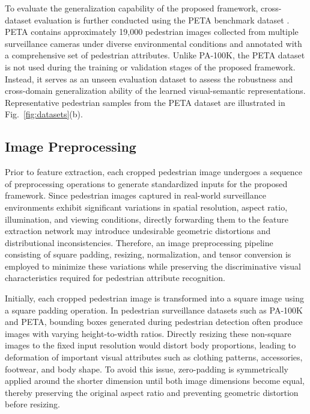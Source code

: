 \documentclass{ieeeaccess}
\begin{document}
To evaluate the generalization capability of the proposed framework, cross-dataset evaluation is further conducted using the PETA benchmark dataset \cite{PETA}. PETA contains approximately 19,000 pedestrian images collected from multiple surveillance cameras under diverse environmental conditions and annotated with a comprehensive set of pedestrian attributes. Unlike PA-100K, the PETA dataset is not used during the training or validation stages of the proposed framework. Instead, it serves as an unseen evaluation dataset to assess the robustness and cross-domain generalization ability of the learned visual-semantic representations. Representative pedestrian samples from the PETA dataset are illustrated in Fig.~\ref{fig:datasets}(b).

\subsection{Image Preprocessing}

Prior to feature extraction, each cropped pedestrian image undergoes a sequence of preprocessing operations to generate standardized inputs for the proposed framework. Since pedestrian images captured in real-world surveillance environments exhibit significant variations in spatial resolution, aspect ratio, illumination, and viewing conditions, directly forwarding them to the feature extraction network may introduce undesirable geometric distortions and distributional inconsistencies. Therefore, an image preprocessing pipeline consisting of square padding, resizing, normalization, and tensor conversion is employed to minimize these variations while preserving the discriminative visual characteristics required for pedestrian attribute recognition.

Initially, each cropped pedestrian image is transformed into a square image using a square padding operation. In pedestrian surveillance datasets such as PA-100K and PETA, bounding boxes generated during pedestrian detection often produce images with varying height-to-width ratios. Directly resizing these non-square images to the fixed input resolution would distort body proportions, leading to deformation of important visual attributes such as clothing patterns, accessories, footwear, and body shape. To avoid this issue, zero-padding is symmetrically applied around the shorter dimension until both image dimensions become equal, thereby preserving the original aspect ratio and preventing geometric distortion before resizing.
\end{document}
